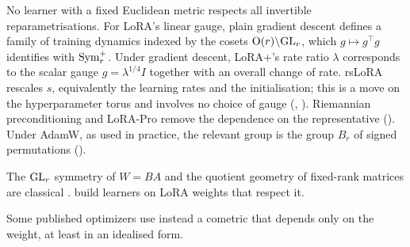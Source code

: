 \begin{explains}
No learner with a fixed Euclidean metric respects all invertible reparametrisations. For LoRA's linear gauge, plain gradient descent defines a family of training dynamics indexed by the cosets $\mathrm{O}(r)\backslash\mathrm{GL}_r$, which $g\mapsto g^\top g$ identifies with $\mathrm{Sym}^+_r$. Under gradient descent, LoRA+'s rate ratio $\lambda$ corresponds to the scalar gauge $g=\lambda^{1/4}I$ together with an overall change of rate. rsLoRA rescales $s$, equivalently the learning rates and the initialisation; this is a move on the hyperparameter torus and involves no choice of gauge (, ). Riemannian preconditioning and LoRA-Pro remove the dependence on the representative (). Under AdamW, as used in practice, the relevant group is the group $B_r$ of signed permutations ().
\end{explains}

The $\mathrm{GL}_r$ symmetry of $W=BA$ and the quotient geometry of fixed-rank matrices are classical \citep{mishra2012fixed}. \citet{putterman2024learning} build learners on LoRA weights that respect it.

Some published optimizers use instead a cometric that depends only on the weight, at least in an idealised form.

